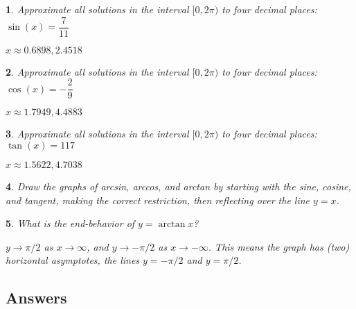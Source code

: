 \documentclass{amsbook}
\newtheorem{exc}{}
\newenvironment{ex}{\begin{exc}\normalfont}{\end{exc}}
\numberwithin{section}{chapter}
\numberwithin{equation}{chapter}
\begin{document}
 
 \begin{ex}
 	Approximate all solutions in the interval $[0,2\pi)$ to four decimal places:\\
 	 $ \sin(x) = \dfrac{7}{11} $
 	\begin{sol}
 		$x \approx 0.6898, 2.4518$
 	\end{sol}
 \end{ex}
 
 \begin{ex}
 Approximate all solutions in the interval $[0,2\pi)$ to four decimal places:\\
 $ \cos(x) = -\dfrac{2}{9} $
 	\begin{sol}
  		$x \approx 1.7949, 4.4883$
 	\end{sol}
 \end{ex}

 
\begin{ex}
	Approximate all solutions in the interval $[0,2\pi)$ to four decimal places:\\
	$ \tan(x) = 117 $
	\begin{sol}
		$x \approx 1.5622, 4.7038$
	\end{sol}
\end{ex}
 
 \begin{ex}
 	Draw the graphs of arcsin, arccos, and arctan by starting with the sine, cosine, and tangent, making the correct restriction, then reflecting over the line $y=x$.
 \end{ex}

 
\begin{ex}
	What is the end-behavior of $y=\arctan x$?
	
\begin{sol}
	$y\to \pi/2$ as $x \to \infty$, and $y\to -\pi/2$ as $x \to -\infty$. This means the graph has (two) horizontal asymptotes, the lines $y=-\pi/2$ and $y=\pi/2$.
\end{sol}
\end{ex}
 
 \subsection*{Answers \nopunct} \hfill
 \begin{multicols}{2}
 	
 \end{multicols}
 
 
 
 
 
 
\end{document}
